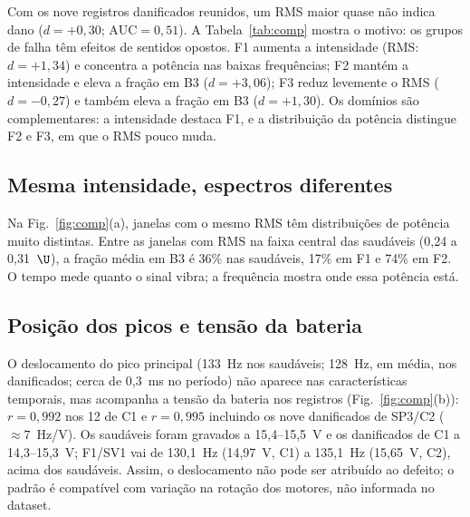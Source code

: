 Com os nove registros danificados reunidos, um RMS maior quase não indica dano ($d=+0{,}30$; $\mathrm{AUC}=0{,}51$). A Tabela~\ref{tab:comp} mostra o motivo: os grupos de falha têm efeitos de sentidos opostos. F1 aumenta a intensidade (RMS: $d=+1{,}34$) e concentra a potência nas baixas frequências; F2 mantém a intensidade e eleva a fração em B3 ($d=+3{,}06$); F3 reduz levemente o RMS ($d=-0{,}27$) e também eleva a fração em B3 ($d=+1{,}30$). Os domínios são complementares: a intensidade destaca F1, e a distribuição da potência distingue F2 e F3, em que o RMS pouco muda.


\subsection{Mesma intensidade, espectros diferentes}
Na Fig.~\ref{fig:comp}(a), janelas com o mesmo RMS têm distribuições de potência muito distintas. Entre as janelas com RMS na faixa central das saudáveis (0,24 a 0,31~$\U$), a fração média em B3 é 36\% nas saudáveis, 17\% em F1 e 74\% em F2. O tempo mede quanto o sinal vibra; a frequência mostra onde essa potência está.

\subsection{Posição dos picos e tensão da bateria}
O deslocamento do pico principal (133~Hz nos saudáveis; 128~Hz, em média, nos danificados; cerca de 0,3~ms no período) não aparece nas características temporais, mas acompanha a tensão da bateria nos registros (Fig.~\ref{fig:comp}(b)): $r=0{,}992$ nos 12 de C1 e $r=0{,}995$ incluindo os nove danificados de SP3/C2 ($\approx7$~Hz/V). Os saudáveis foram gravados a 15,4--15,5~V e os danificados de C1 a 14,3--15,3~V; F1/SV1 vai de 130,1~Hz (14,97~V, C1) a 135,1~Hz (15,65~V, C2), acima dos saudáveis. Assim, o deslocamento não pode ser atribuído ao defeito; o padrão é compatível com variação na rotação dos motores, não informada no dataset.

